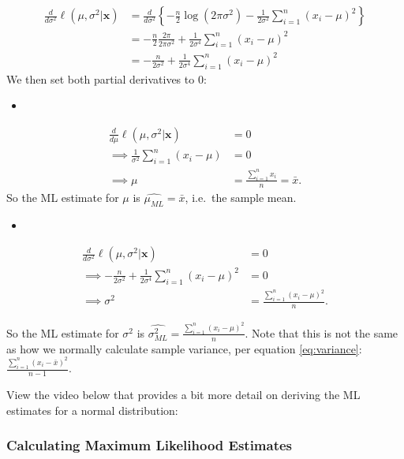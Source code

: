 \documentclass[
]{book}
\providecommand{\tightlist}{%
  \setlength{\itemsep}{0pt}\setlength{\parskip}{0pt}}
\begin{document}
\[
\begin{split}
\frac{d}{d \sigma^2}\ell (\mu, \sigma^2 | \boldsymbol{x}) &= \frac{d}{d \sigma^2} \left\{ -\frac{n}{2} \log (2 \pi \sigma^2) - \frac{1}{2 \sigma^2} \sum_{i=1}^n (x_i - \mu)^2 \right \} \\
                                                     &= -\frac{n}{2}\frac{2\pi}{2 \pi \sigma^2} + \frac{1}{2 \sigma^4} \sum_{i=1}^n (x_i - \mu)^2 \\
                                                     &= -\frac{n}{2 \sigma^2} + \frac{1}{2 \sigma^4} \sum_{i=1}^n (x_i - \mu)^2
\end{split}
\]
We then set both partial derivatives to 0:

\begin{itemize}
\tightlist
\item
\end{itemize}

\[
\begin{split}
\frac{d}{d \mu}\ell (\mu, \sigma^2 | \boldsymbol{x}) &= 0 \\
\implies \frac{1}{\sigma^2} \sum_{i=1}^n (x_i - \mu) &= 0 \\
\implies \mu  &= \frac{\sum_{i=1}^n x_i}{n} = \bar{x}.
\end{split}
\]
So the ML estimate for \(\mu\) is \(\hat{\mu_{ML}} = \bar{x}\), i.e.~the sample mean.

\begin{itemize}
\tightlist
\item
\end{itemize}

\[
\begin{split}
\frac{d}{d \sigma^2}\ell (\mu, \sigma^2 | \boldsymbol{x}) &= 0 \\
\implies -\frac{n}{2 \sigma^2} + \frac{1}{2 \sigma^4} \sum_{i=1}^n (x_i - \mu)^2 &= 0 \\
\implies \sigma^2 &= \frac{\sum_{i=1}^n (x_i - \mu)^2}{n}.
\end{split}
\]

So the ML estimate for \(\sigma^2\) is \(\hat{\sigma_{ML}^2} = \frac{\sum_{i=1}^n (x_i - \mu)^2}{n}\). Note that this is not the same as how we normally calculate sample variance, per equation \eqref{eq:variance}: \(\frac{\sum_{i=1}^n (x_i-\bar{x})^2}{n-1}\).

View the video below that provides a bit more detail on deriving the ML estimates for a normal distribution:

\subsubsection{Calculating Maximum Likelihood Estimates}\label{calculating-maximum-likelihood-estimates}
\end{document}
